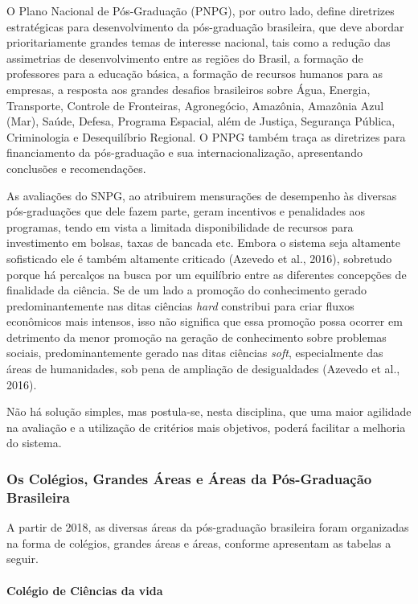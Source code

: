 \documentclass[]{article}
\let\oldparagraph\paragraph
\renewcommand{\paragraph}[1]{\oldparagraph{#1}\mbox{}}
\begin{document}
O Plano Nacional de Pós-Graduação (PNPG), por outro lado, define
diretrizes estratégicas para desenvolvimento da pós-graduação
brasileira, que deve abordar prioritariamente grandes temas de interesse
nacional, tais como a redução das assimetrias de desenvolvimento entre
as regiões do Brasil, a formação de professores para a educação básica,
a formação de recursos humanos para as empresas, a resposta aos grandes
desafios brasileiros sobre Água, Energia, Transporte, Controle de
Fronteiras, Agronegócio, Amazônia, Amazônia Azul (Mar), Saúde, Defesa,
Programa Espacial, além de Justiça, Segurança Pública, Criminologia e
Desequilíbrio Regional. O PNPG também traça as diretrizes para
financiamento da pós-graduação e sua internacionalização, apresentando
conclusões e recomendações.

As avaliações do SNPG, ao atribuirem mensurações de desempenho às
diversas pós-graduações que dele fazem parte, geram incentivos e
penalidades aos programas, tendo em vista a limitada disponibilidade de
recursos para investimento em bolsas, taxas de bancada etc. Embora o
sistema seja altamente sofisticado ele é também altamente criticado
(Azevedo et al., 2016), sobretudo porque há percalços na busca por um
equilíbrio entre as diferentes concepções de finalidade da ciência. Se
de um lado a promoção do conhecimento gerado predominantemente nas ditas
ciências \emph{hard} constribui para criar fluxos econômicos mais
intensos, isso não significa que essa promoção possa ocorrer em
detrimento da menor promoção na geração de conhecimento sobre problemas
sociais, predominantemente gerado nas ditas ciências \emph{soft},
especialmente das áreas de humanidades, sob pena de ampliação de
desigualdades (Azevedo et al., 2016).

Não há solução simples, mas postula-se, nesta disciplina, que uma maior
agilidade na avaliação e a utilização de critérios mais objetivos,
poderá facilitar a melhoria do sistema.

\subsubsection{Os Colégios, Grandes Áreas e Áreas da Pós-Graduação
Brasileira}\label{os-colegios-grandes-areas-e-areas-da-pos-graduacao-brasileira}

A partir de 2018, as diversas áreas da pós-graduação brasileira foram
organizadas na forma de colégios, grandes áreas e áreas, conforme
apresentam as tabelas a seguir.

\paragraph{Colégio de Ciências da
vida}\label{colegio-de-ciencias-da-vida}
\end{document}
